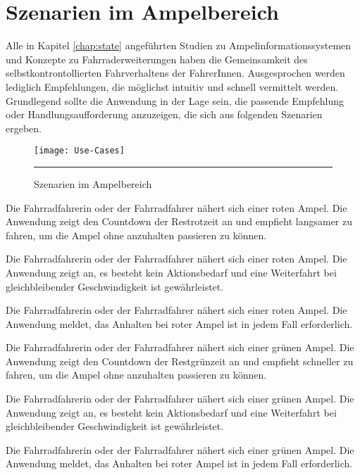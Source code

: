 \chapter{\label{chap:szenarien}Szenarien im Ampelbereich}
Alle in Kapitel \ref{chap:state} angeführten Studien zu Ampelinformationssystemen und Konzepte zu Fahrraderweiterungen haben die Gemeinsamkeit des selbstkontrontollierten Fahrverhaltens der FahrerInnen. Ausgesprochen werden lediglich Empfehlungen, die möglichst intuitiv und schnell vermittelt werden. Grundlegend sollte die Anwendung in der Lage sein, die passende Empfehlung oder Handlungsaufforderung anzuzeigen, die sich aus folgenden Szenarien ergeben.
\begin{figure}[H]  
    \centering  
    \texttt{[image: Use-Cases]} 
    \rule{35em}{0.5pt}
    \caption[Szenarien]{Szenarien im Ampelbereich}
    \label{fig:szenarien}
\end{figure}
\begin{description}[leftmargin=0.7cm,style=nextline]
\item[Szenario R1:] 
Die Fahrradfahrerin oder der Fahrradfahrer nähert sich einer roten Ampel. Die Anwendung zeigt den Countdown der Restrotzeit an und empfieht langsamer zu fahren, um die Ampel ohne anzuhalten passieren zu können.  \\
\item[Szenario R2:] 
Die Fahrradfahrerin oder der Fahrradfahrer nähert sich einer roten Ampel. Die Anwendung zeigt an, es besteht kein Aktionsbedarf und eine Weiterfahrt bei gleichbleibender Geschwindigkeit ist gewährleistet. \\
\item[Szenario R3:] 
Die Fahrradfahrerin oder der Fahrradfahrer nähert sich einer roten Ampel. Die Anwendung meldet, das Anhalten bei roter Ampel ist in jedem Fall erforderlich.\\
\item[Szenario G1:] 
Die Fahrradfahrerin oder der Fahrradfahrer nähert sich einer grünen Ampel. Die Anwendung zeigt den Countdown der Restgrünzeit an und empfieht schneller zu fahren, um die Ampel ohne anzuhalten passieren zu können.\\
\item[Szenario G2:] 
Die Fahrradfahrerin oder der Fahrradfahrer nähert sich einer grünen Ampel. Die Anwendung zeigt an, es besteht kein Aktionsbedarf und eine Weiterfahrt bei gleichbleibender Geschwindigkeit ist gewährleistet.\\ 
\item[Szenario G3:] 
Die Fahrradfahrerin oder der Fahrradfahrer nähert sich einer grünen Ampel. Die Anwendung meldet, das Anhalten bei roter Ampel ist in jedem Fall erforderlich.
\end{description} \vspace{27pt}
